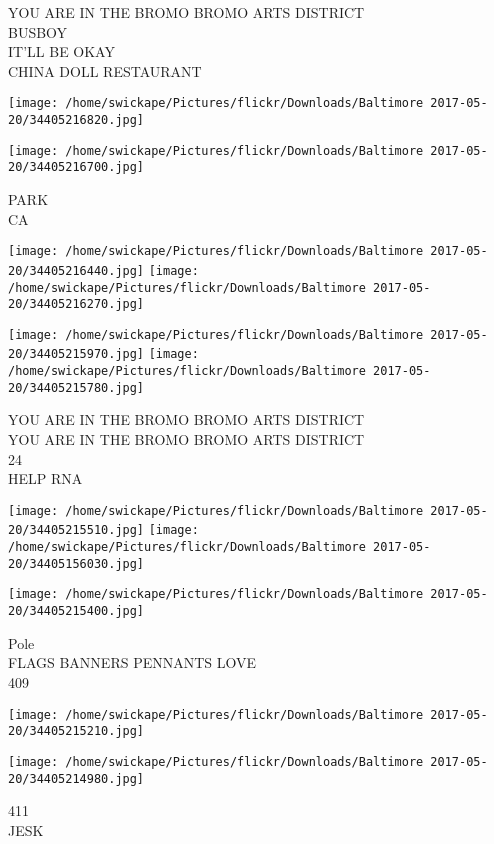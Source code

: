 \documentclass[10pt,letterpaper]{article}
\begin{document}
YOU ARE IN THE BROMO BROMO ARTS DISTRICT\\
BUSBOY\\
IT'LL BE OKAY\\
CHINA DOLL RESTAURANT
\pagebreak

\texttt{[image: /home/swickape/Pictures/flickr/Downloads/Baltimore 2017-05-20/34405216820.jpg]}

\vspace{0.25in}
\texttt{[image: /home/swickape/Pictures/flickr/Downloads/Baltimore 2017-05-20/34405216700.jpg]}

PARK\\
CA
\pagebreak

\texttt{[image: /home/swickape/Pictures/flickr/Downloads/Baltimore 2017-05-20/34405216440.jpg]}
\texttt{[image: /home/swickape/Pictures/flickr/Downloads/Baltimore 2017-05-20/34405216270.jpg]}

\texttt{[image: /home/swickape/Pictures/flickr/Downloads/Baltimore 2017-05-20/34405215970.jpg]}
\texttt{[image: /home/swickape/Pictures/flickr/Downloads/Baltimore 2017-05-20/34405215780.jpg]}

YOU ARE IN THE BROMO BROMO ARTS DISTRICT\\
YOU ARE IN THE BROMO BROMO ARTS DISTRICT\\
24\\
HELP RNA
\pagebreak

\texttt{[image: /home/swickape/Pictures/flickr/Downloads/Baltimore 2017-05-20/34405215510.jpg]}
\texttt{[image: /home/swickape/Pictures/flickr/Downloads/Baltimore 2017-05-20/34405156030.jpg]}

\vspace{0.25in}
\texttt{[image: /home/swickape/Pictures/flickr/Downloads/Baltimore 2017-05-20/34405215400.jpg]}

Pole\\
FLAGS BANNERS PENNANTS LOVE\\
409
\pagebreak

\texttt{[image: /home/swickape/Pictures/flickr/Downloads/Baltimore 2017-05-20/34405215210.jpg]}

\vspace{0.25in}
\texttt{[image: /home/swickape/Pictures/flickr/Downloads/Baltimore 2017-05-20/34405214980.jpg]}

411\\
JESK
\pagebreak
\end{document}
